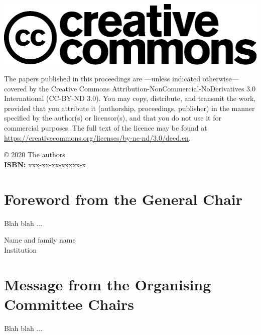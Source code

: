 \documentclass[a4paper,11pt,twoside]{book}
\newcommand{\newoddpage} {\clearpage
  \ifthenelse{\isodd{\value{page}}}{}
  {\thispagestyle{empty}\quad\newpage}}
\begin{document}
\newoddpage
\thispagestyle{empty}
\vfill \mbox{} \vfill

\noindent \includegraphics[scale=0.5]{logos/creative_commons.pdf} 

\noindent 
The papers published in this proceedings are ---unless indicated
otherwise--- covered by the Creative Commons
Attribution-NonCommercial-NoDerivatives 3.0 International (CC-BY-ND
3.0). You may copy, distribute, and transmit the work, provided that
you attribute it (authorship, proceedings, publisher) in the manner
specified by the author(s) or licensor(s), and that you do not use it
for commercial purposes. The full text of the licence may be found at
\url{https://creativecommons.org/licenses/by-nc-nd/3.0/deed.en}.

\vspace{1cm}

\noindent © 2020 The authors\\
\noindent \textbf{ISBN:} xxx-xx-xx-xxxxx-x\\


\vfill \mbox{}


\newoddpage
\frontmatter

\tableofcontents

\chapter*{Foreword from the General Chair}

Blah blah ...

\begin{center}
Name and family name\\
\noindent Institution
\end{center}


\chapter*{Message from the Organising Committee Chairs}
Blah blah ...
\end{document}
